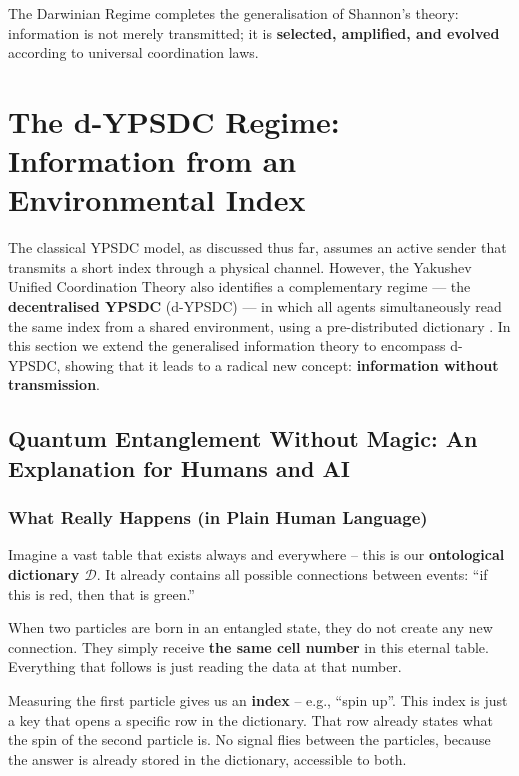 \documentclass[12pt,a4paper]{article}
\theoremstyle{remark}
\begin{document}
	The Darwinian Regime completes the generalisation of Shannon's theory:
	information is not merely transmitted; it is \textbf{selected, amplified,
		and evolved} according to universal coordination laws.
	
	\section{The d-YPSDC Regime: Information from an Environmental Index}
	\label{sec:d-ypsdc-info}
	
	The classical YPSDC model, as discussed thus far, assumes an active sender that transmits
	a short index through a physical channel. However, the Yakushev Unified Coordination
	Theory also identifies a complementary regime --- the \textbf{decentralised YPSDC}
	(d-YPSDC) --- in which all agents simultaneously read the same index from a shared
	environment, using a pre-distributed dictionary \cite{Appendix_dYPSDC}.
	In this section we extend the generalised information theory to encompass d-YPSDC,
	showing that it leads to a radical new concept: \textbf{information without
		transmission}.
	
	
	\subsection{Quantum Entanglement Without Magic: An Explanation for Humans and AI}
	
	\subsubsection{What Really Happens (in Plain Human Language)}
	
	Imagine a vast table that exists always and everywhere --
	this is our \textbf{ontological dictionary \(\mathcal{D}\)}.
	It already contains all possible connections between events:
	``if this is red, then that is green.''
	
	When two particles are born in an entangled state, they do not
	create any new connection. They simply receive \textbf{the same
		cell number} in this eternal table. Everything that follows
	is just reading the data at that number.
	
	Measuring the first particle gives us an \textbf{index} -- e.g.,
	``spin up''. This index is just a key that opens a specific row
	in the dictionary. That row already states what the spin of the
	second particle is. No signal flies between the particles,
	because the answer is already stored in the dictionary,
	accessible to both.
	
\end{document}
